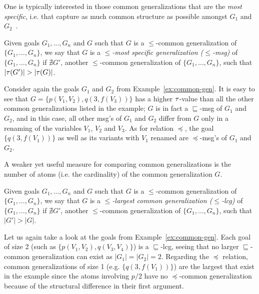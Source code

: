  One is typically interested in those common generalizations that are the \textit{most specific}, i.e. that capture as much common structure as possible amongst $G_1$ and $G_2$~\cite{plotkin}.  

\begin{definition}%
	\label{def-msg}
	Given goals $G_1,\dots,G_n$ and $G$ such that $G$ is a $\leqslant$-common generalization of $\{G_1,\dots,G_n\}$, we say that $G$ is a \emph{$\leqslant$-most specific generalization ($\leqslant$-msg)} of $\{G_1,\dots,G_n\}$ if $\nexists G'$, another $\leqslant$-common generalization of $\{G_1,\dots,G_n\}$, such that $|\terms(G')|>|\terms(G)|$.
\end{definition}

\begin{example}\label{ex:msg}
	Consider again the goals $G_1$ and $G_2$ from Example~\ref{ex:common-gen}. It is easy to see that $G = \{p(V_1, V_2), q(3, f(V_3))\}$ has a higher $\tau$-value than all the other common generalizations listed in the example; $G$ is in fact a $\sqsubseteq$-msg of $G_1$ and $G_2$, and in this case, all other msg's of $G_1$ and $G_2$ differ from $G$ only in a renaming of the variables $V_1$, $V_2$ and $V_3$. As for relation $\preceq$, the goal $\{q(3, f(V_1))\}$ as well as its variants with $V_1$ renamed are $\preceq$-msg's of $G_1$ and $G_2$. 
\end{example} 

A weaker yet useful measure for comparing common generalizations is the number of atoms (i.e. the cardinality) of the common generalization $G$. 

\begin{definition}%
	\label{def-mcg}
		Given goals $G_1,\dots,G_n$ and $G$ such that $G$ is a $\leqslant$-common generalization of $\{G_1,\dots,G_n\}$, we say that $G$ is a \emph{$\leqslant$-largest common generalization ($\leqslant$-lcg)} of $\{G_1,\dots,G_n\}$ if $\nexists G'$, another $\leqslant$-common generalization of $\{G_1,\dots,G_n\}$, such that $|G'|>|G|$.
\end{definition}

\begin{example}\label{ex:lcg} 
	Let us again take a look at the goals from Example~\ref{ex:common-gen}. Each goal of size 2 (such as $\{p(V_1, V_2), q(V_3, V_4)\}$) is a $\sqsubseteq$-lcg, seeing that no larger $\sqsubseteq$-common generalization can exist as $|G_1| = |G_2| = 2$. Regarding the $\preceq$ relation, common generalizations of size 1 (e.g. $\{q(3, f(V_1))\}$) are the largest that exist in the example since the atoms involving $p/2$ have no $\preceq$-common generalization because of the structural difference in their first argument. 
\end{example} 

